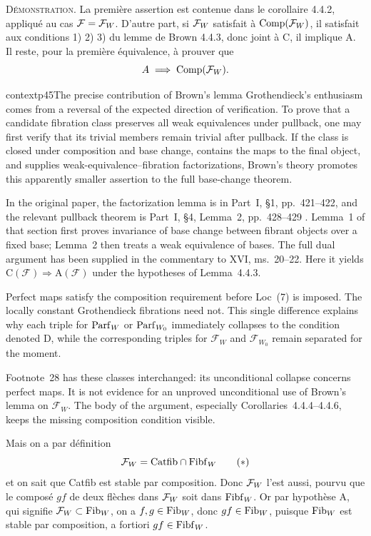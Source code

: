 
\textsc{Démonstration}. La première assertion est contenue dans le corollaire 4.4.2, appliqué au cas $\mathcal{F} = \mathcal{F}_W$. D'autre part, si $\mathcal{F}_W$ satisfait à $\mathrm{Comp}(\mathcal{F}_W)$, il satisfait aux conditions 1) 2) 3) du lemme de Brown 4.4.3, donc joint à C, il implique A. Il reste, pour la première équivalence, à prouver que
\[
A \;\Longrightarrow\; \mathrm{Comp}(\mathcal{F}_W).
\]


\begin{dcomment}{context}{p45}{The precise contribution of Brown's lemma}
Grothendieck's enthusiasm comes from a reversal of the expected direction of verification. To prove that a candidate fibration class preserves all weak equivalences under pullback, one may first verify that its trivial members remain trivial after pullback. If the class is closed under composition and base change, contains the maps to the final object, and supplies weak-equivalence--fibration factorizations, Brown's theory promotes this apparently smaller assertion to the full base-change theorem.

In the original paper, the factorization lemma is in Part~I, \S1, pp.~421--422, and the relevant pullback theorem is Part~I, \S4, Lemma~2, pp.~428--429 \citep{Brown1973}. Lemma~1 of that section first proves invariance of base change between fibrant objects over a fixed base; Lemma~2 then treats a weak equivalence of bases. The full dual argument has been supplied in the commentary to XVI, ms.~20--22. Here it yields $\mathrm C(\mathcal F)\Rightarrow\mathrm A(\mathcal F)$ under the hypotheses of Lemma~4.4.3.

Perfect maps satisfy the composition requirement before Loc~(7) is imposed. The locally constant Grothendieck fibrations need not. This single difference explains why each triple for $\mathrm{Parf}_W$ or $\mathrm{Parf}_{W_0}$ immediately collapses to the condition denoted D, while the corresponding triples for $\mathcal F_W$ and $\mathcal F_{W_0}$ remain separated for the moment.

Footnote~28 has these classes interchanged: its unconditional collapse concerns perfect maps. It is not evidence for an unproved unconditional use of Brown's lemma on $\mathcal F_W$. The body of the argument, especially Corollaries~4.4.4--4.4.6, keeps the missing composition condition visible.
\end{dcomment}


Mais on a par définition
\[
\cF_W = \Catfib \cap \Fibf_W
\tag*{$(*)$}
\]
et on sait que Catfib est stable par composition. Donc $\mathcal{F}_W$ l'est aussi, pourvu que le composé $gf$ de deux flèches dans $\mathcal{F}_W$ soit dans $\mathrm{Fibf}_W$. Or par hypothèse A, qui signifie $\mathcal{F}_W \subset \mathrm{Fib}_W$, on a $f, g \in \mathrm{Fib}_W$, donc $gf \in \mathrm{Fib}_W$, puisque $\mathrm{Fib}_W$ est stable par composition, a fortiori $gf \in \mathrm{Fibf}_W$.

